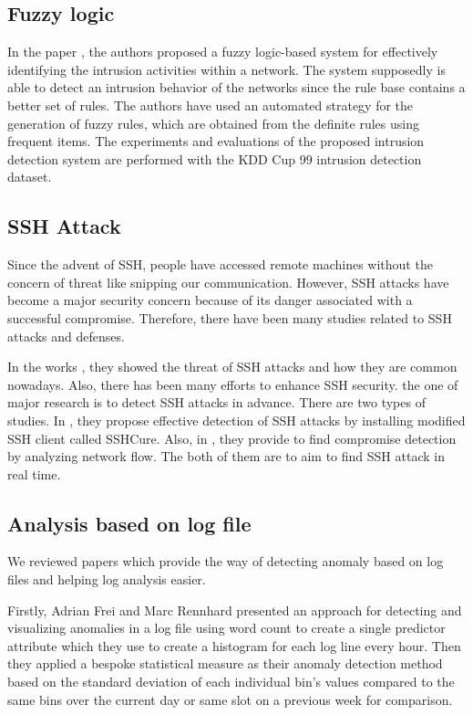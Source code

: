 \documentclass [11pt]{article}
\begin{document}
\subsection{Fuzzy logic}
In the paper \cite{shanmugavadivu2011network}, the authors proposed a fuzzy logic-based system for effectively identifying the intrusion activities within a network. The system supposedly is able to detect an intrusion behavior of the networks since the rule base contains a better set of rules. 
The authors have used an automated strategy for the generation of fuzzy rules, which
are obtained from the definite rules using frequent items. The experiments and evaluations of the proposed intrusion detection system are performed with the KDD Cup 99 intrusion detection dataset.

\subsection{SSH Attack}
Since the advent of SSH, people have accessed remote machines without the concern of threat like snipping our communication. However, SSH attacks have become a major security concern because of its danger associated with a successful compromise\cite{hellemons2012sshcure}. Therefore, there have been many studies related to SSH attacks and defenses. 

In the works \cite{owens2008study,ramsbrock2007profiling,seifert2006analyzing}, they showed the threat of SSH attacks and how they are common nowadays. Also, there has been many efforts to enhance SSH security. the one of major research is to detect SSH attacks in advance. There are two types of studies. In \cite{hellemons2012sshcure}, they propose effective detection of SSH attacks by installing modified SSH client called SSHCure. Also, in \cite{hofstede2014ssh}, they provide to find compromise detection by analyzing network flow. The both of them are to aim to find SSH attack in real time.

\subsection{Analysis based on log file}
We reviewed papers which provide the way of detecting anomaly based on log files and helping log analysis easier. 

Firstly, Adrian Frei and Marc Rennhard \cite{Frei2008} presented an approach for detecting and visualizing
anomalies in a log file using word count to create a single predictor attribute which they use to create a histogram for each log line every hour. Then they applied a bespoke statistical measure as their anomaly detection method based on the standard deviation of each individual bin’s values compared to the same bins over the current day or same slot on a previous week for comparison.
\end{document}
